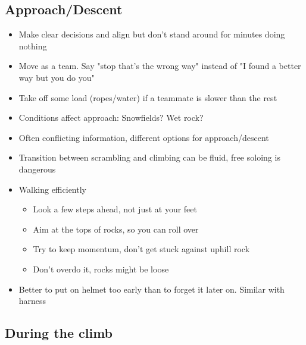 \subsection{Approach/Descent}
\begin{itemize}
\item Make clear decisions and align but don't stand around for minutes doing nothing
\item Move as a team. Say "stop that's the wrong way" instead of "I found a better way but you do you"
\item Take off some load (ropes/water) if a teammate is slower than the rest
\item Conditions affect approach: Snowfields? Wet rock?
\item Often conflicting information, different options for approach/descent
\item Transition between scrambling and climbing can be fluid, free soloing is dangerous
\item Walking efficiently
	\begin{itemize}
	\item Look a few steps ahead, not just at your feet
	\item Aim at the tops of rocks, so you can roll over
	\item Try to keep momentum, don't get stuck against uphill rock
	\item Don't overdo it, rocks might be loose
	\end{itemize}
\item Better to put on helmet too early than to forget it later on. Similar with harness
\end{itemize}

\subsection{During the climb}
